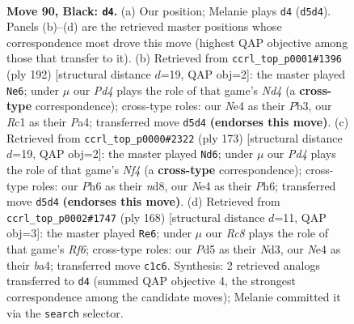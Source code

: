 \documentclass[11pt]{article}
\begin{document}
\clearpage

\begin{figure}[p]\centering
\begin{subfigure}{0.46\textwidth}\centering
\resizebox{\linewidth}{!}{%
\newchessgame
\chessboard[
  setfen={8/8/4k2p/3pp3/1K2n2b/8/R7/2r5 b - - 5 90},
  showmover=false,
  pgfstyle=straightmove, color=movearrow, markmove={d5-d4}
]}
\caption{}
\end{subfigure}\hfill
\begin{subfigure}{0.46\textwidth}\centering
\resizebox{\linewidth}{!}{%
\newchessgame
\chessboard[
  setfen={2r5/8/8/p2K4/P2N4/1P6/5k2/8 w - - 1 97},
  showmover=false,
  pgfstyle=straightmove, color=movearrow, markmove={d4-e6}
]}
\caption{}
\end{subfigure}
\\[4pt]
\begin{subfigure}{0.46\textwidth}\centering
\resizebox{\linewidth}{!}{%
\newchessgame
\chessboard[
  setfen={3N4/8/5k1p/5np1/8/2N5/5K2/8 b - - 25 87},
  showmover=false,
  pgfstyle=straightmove, color=movearrow, markmove={f5-d6}
]}
\caption{}
\end{subfigure}\hfill
\begin{subfigure}{0.46\textwidth}\centering
\resizebox{\linewidth}{!}{%
\newchessgame
\chessboard[
  setfen={8/2k5/5R2/8/bPK5/P2N4/8/7r w - - 35 85},
  showmover=false,
  pgfstyle=straightmove, color=movearrow, markmove={f6-e6}
]}
\caption{}
\end{subfigure}
\caption{\textbf{Move 90, Black: \texttt{d4}.} (a) Our position; Melanie plays \texttt{d4} (\texttt{d5d4}). Panels (b)--(d) are the retrieved master positions whose correspondence most drove this move (highest QAP objective among those that transfer to it). (b) Retrieved from \texttt{ccrl\_top\_p0001\#1396} (ply 192) [structural distance $d$=19, QAP obj=2]: the master played \texttt{Ne6}; under $\mu$ our \emph{Pd4} plays the role of that game's \emph{Nd4} (a \textbf{cross-type} correspondence); cross-type roles: our \emph{N}e4 as their \emph{P}b3, our \emph{R}c1 as their \emph{P}a4; transferred move \texttt{d5d4} \textbf{(endorses this move)}. (c) Retrieved from \texttt{ccrl\_top\_p0000\#2322} (ply 173) [structural distance $d$=19, QAP obj=2]: the master played \texttt{Nd6}; under $\mu$ our \emph{Pd4} plays the role of that game's \emph{Nf4} (a \textbf{cross-type} correspondence); cross-type roles: our \emph{P}h6 as their \emph{n}d8, our \emph{N}e4 as their \emph{P}h6; transferred move \texttt{d5d4} \textbf{(endorses this move)}. (d) Retrieved from \texttt{ccrl\_top\_p0002\#1747} (ply 168) [structural distance $d$=11, QAP obj=3]: the master played \texttt{Re6}; under $\mu$ our \emph{Rc8} plays the role of that game's \emph{Rf6}; cross-type roles: our \emph{P}d5 as their \emph{N}d3, our \emph{N}e4 as their \emph{b}a4; transferred move \texttt{c1c6}. Synthesis: 2 retrieved analogs transferred to \texttt{d4} (summed QAP objective 4, the strongest correspondence among the candidate moves); Melanie committed it via the \texttt{search} selector.}
\label{fig:thought-m179}
\end{figure}
\end{document}
